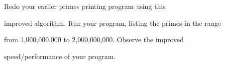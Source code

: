 Redo your earlier primes printing program using this

improved algorithm. Run your program, listing the primes in the range

from 1,000,000,000 to 2,000,000,000. Observe the improved

speed/performance of your program.


